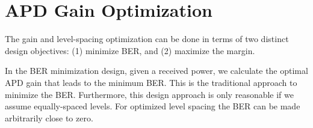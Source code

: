 \documentclass[a4paper]{article}
\begin{document}






\section{APD Gain Optimization}

The gain and level-spacing optimization can be done in terms of two distinct design objectives: (1) minimize BER, and (2) maximize the margin. 

In the BER minimization design, given a received power, we calculate the optimal APD gain that leads to the minimum BER. This is the traditional approach to minimize the BER. Furthermore, this design approach is only reasonable if we assume equally-spaced levels. For optimized level spacing the BER can be made arbitrarily close to zero.
\end{document}
